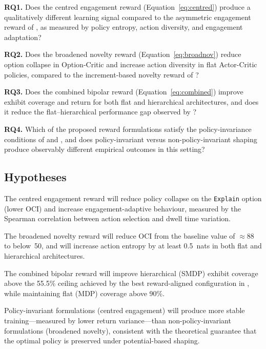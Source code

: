 \documentclass[12pt,a4paper]{article}
\begin{document}
\medskip
\noindent\textbf{RQ1.} Does the centred engagement reward (Equation~\ref{eq:centred}) produce a qualitatively different learning signal compared to the asymmetric engagement reward of \citet{bourdon2025}, as measured by policy entropy, action diversity, and engagement adaptation?

\noindent\textbf{RQ2.} Does the broadened novelty reward (Equation~\ref{eq:broadnov}) reduce option collapse in Option-Critic and increase action diversity in flat Actor-Critic policies, compared to the increment-based novelty reward of \citet{bourdon2025}?

\noindent\textbf{RQ3.} Does the combined bipolar reward (Equation~\ref{eq:combined}) improve exhibit coverage and return for both flat and hierarchical architectures, and does it reduce the flat--hierarchical performance gap observed by \citet{bourdon2025}?

\noindent\textbf{RQ4.} Which of the proposed reward formulations satisfy the policy-invariance conditions of \citet{ng1999} and \citet{devlin2012}, and does policy-invariant versus non-policy-invariant shaping produce observably different empirical outcomes in this setting?

\subsection{Hypotheses}

\begin{description}[style=nextline, leftmargin=1.5cm]
    \item[H1] The centred engagement reward will reduce policy collapse on the \texttt{Explain} option (lower OCI) and increase engagement-adaptive behaviour, measured by the Spearman correlation between action selection and dwell time variation.

    \item[H2] The broadened novelty reward will reduce OCI from the baseline value of $\approx 88$ to below~50, and will increase action entropy by at least 0.5~nats in both flat and hierarchical architectures.

    \item[H3] The combined bipolar reward will improve hierarchical (SMDP) exhibit coverage above the 55.5\% ceiling achieved by the best reward-aligned configuration in \citet{bourdon2025}, while maintaining flat (MDP) coverage above 90\%.

    \item[H4] Policy-invariant formulations (centred engagement) will produce more stable training---measured by lower return variance---than non-policy-invariant formulations (broadened novelty), consistent with the theoretical guarantee that the optimal policy is preserved under potential-based shaping.
\end{description}
\end{document}
